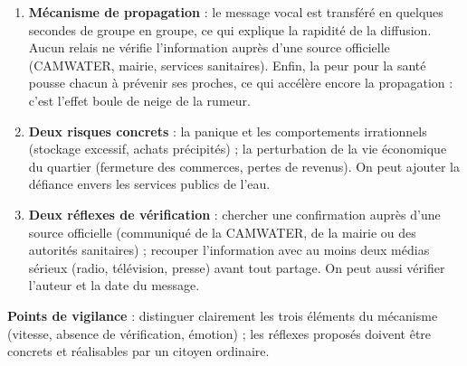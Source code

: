 \documentclass[11pt]{article}
\newcommand{\cle}[1]{{\popxbold\color{popdark}#1}}
\begin{document}
\begin{corrige}
\begin{enumerate}
\item \textbf{Mécanisme de propagation} : le message vocal est transféré en quelques secondes de groupe en groupe, ce qui explique la rapidité de la diffusion. Aucun relais ne vérifie l'information auprès d'une source officielle (CAMWATER, mairie, services sanitaires). Enfin, la peur pour la santé pousse chacun à prévenir ses proches, ce qui accélère encore la propagation : c'est l'effet boule de neige de la \cle{rumeur}.
\item \textbf{Deux risques concrets} : la panique et les comportements irrationnels (stockage excessif, achats précipités) ; la perturbation de la vie économique du quartier (fermeture des commerces, pertes de revenus). On peut ajouter la défiance envers les services publics de l'eau.
\item \textbf{Deux réflexes de vérification} : chercher une confirmation auprès d'une source officielle (communiqué de la CAMWATER, de la mairie ou des autorités sanitaires) ; recouper l'information avec au moins deux médias sérieux (radio, télévision, presse) avant tout partage. On peut aussi vérifier l'auteur et la date du message.
\end{enumerate}
\textbf{Points de vigilance} : distinguer clairement les trois éléments du mécanisme (vitesse, absence de vérification, émotion) ; les réflexes proposés doivent être concrets et réalisables par un citoyen ordinaire.
\end{corrige}
\end{document}
